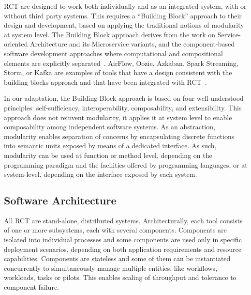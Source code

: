 \documentclass[preprint,12pt, a4paper]{elsarticle}
\begin{document}
RCT are designed to work both individually and as an integrated system, with
or without third party systems. This requires a ``Building Block'' approach
to their design and development, based on applying the traditional notions of
modularity at system level. The Building Block approach derives from the work
on Service-oriented Architecture and its Microservice variants, and the
component-based software development approaches where computational and
compositional elements are explicitly
separated~\cite{batory1992design,garlan1995architectural,lenz1988software,clemens1998component,schneider2000components}.
AirFlow, Oozie, Azkaban, Spark Streaming, Storm, or Kafka are examples of
tools that have a design consistent with the building blocks approach and
that have been integrated with RCT~\cite{}.

In our adaptation, the Building Block approach is based on four
well-understood principles: self-sufficiency, interoperability,
composability, and extensibility. This approach does not reinvent modularity,
it applies it at system level to enable composability among independent
software systems. As an abstraction, modularity enables separation of
concerns by encapsulating discrete functions into semantic units exposed by
means of a dedicated interface. As such, modularity can be used at function
or method level, depending on the programming paradigm and the facilities
offered by programming languages, or at system-level, depending on the
interface exposed by each system.

\subsection{Software Architecture}\label{ssec:architecture}


All RCT are stand-alone, distributed systems. Architecturally, each tool
consists of one or more subsystems, each with several components. Components
are isolated into individual processes and some components are used only in
specific deployment scenarios, depending on both application requirements and
resource capabilities. Components are stateless and some of them can be
instantiated concurrently to simultaneously manage multiple entities, like
workflows, workloads, tasks or pilots. This enables scaling of throughput and
tolerance to component failure.
\end{document}
